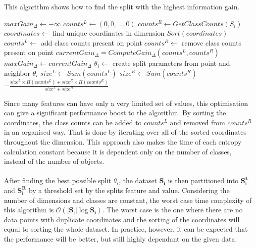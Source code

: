 \documentclass[11pt]{article}
\begin{document}
        \begin{algorithm}
          \caption{This algorithm shows how to find the split with the highest information gain. \cite{brabec}}
          \label{alg:best_split}
          \begin{algorithmic}[1] %
              \State $maxGain_\Delta \gets -\infty$
                \State $counts^L \gets (0, 0, ..., 0)$
                \State $counts^R \gets GetClassCounts(S_i)$
                \State $coordinates \gets$ find unique coordinates in dimension
                \State $Sort(coordinates)$
                  \State $counts^L \gets$ add class counts present on point
                  \State $counts^R \gets$ remove class counts present on point
                  \State $currentGain_\Delta = ComputeGain_\Delta(counts^L, counts^R)$
                    \State $maxGain_\Delta \gets currentGain_\Delta$
                    \State $\theta_i \gets$ create split parameters from point and neighbor
                  \EndIf
                \EndFor
              \EndFor
              \State \Return $\theta_i$
            \EndFunction
              \State $size^L \gets Sum(counts^L)$
              \State $size^R \gets Sum(counts^R)$
              \State \Return $- \frac{size^L \times H(counts^L) + size^R \times H(counts^R)}{size^L + size^R}$
            \EndFunction
          \end{algorithmic}
        \end{algorithm}
        Since many features can have only a very limited set of values, this optimisation can give a significant performance boost to the algorithm. \cite{brabec} By sorting the coordinates, the class counts can be added to $counts^L$ and removed from $counts^R$ in an organised way. That is done by iterating over all of the sorted coordinates throughout the dimension. This approach also makes the time of each entropy calculation constant because it is dependent only on the number of classes, instead of the number of objects. \cite{brabec}
        \\~\\
        After finding the best possible split $\theta_i$, the dataset $\mathbf{S_i}$ is then partitioned into $\mathbf{S_i^L}$ and $\mathbf{S_i^R}$ by a threshold set by the splits feature and value. Considering the number of dimensions and classes are constant, the worst case time complexity of this algorithm is $\mathcal{O}(|\mathbf{S_i}|\log{\mathbf{S_i}})$. The worst case is the one where there are no data points with duplicate coordinates and the sorting of the coordinates will equal to sorting the whole dataset. In practice, however, it can be expected that the performance will be better, but still highly dependant on the given data. \cite{brabec}
\end{document}

